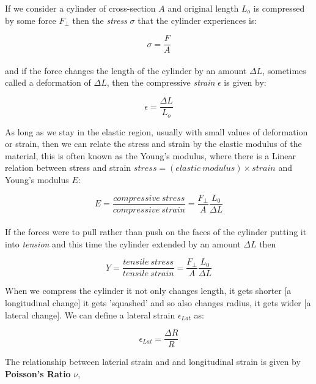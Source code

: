 \documentclass[12pt, letterpaper, twoside]{article}
\begin{document}
\bigskip

If we consider a cylinder of cross-section $A$ and original length $L_o$ is compressed by some force $F_\bot$ then the \emph{stress} $\sigma$ that the cylinder experiences is:

\begin{equation}
\sigma = \frac{F}{A}
\end{equation}
\\
and if the force changes the length of the cylinder by an amount $\Delta L$, sometimes called a deformation of $\Delta L$, then the compressive \emph{strain} $\epsilon$ is given by:

\begin{equation}
\epsilon = \frac{\Delta L}{L_o}
\end{equation}


\bigskip

As long as we stay in the elastic region, usually with small values of deformation or strain, then we can relate the stress and strain by the elastic modulus of the material, this is often known as the Young's modulus, where there is a Linear relation between stress and strain $ stress = (elastic \ modulus) \times strain $ and Young's modulus $E$:

\begin{equation}
E = \frac{compressive \ stress}{compressive \ strain} = \frac{F_\bot}{A} \frac{L_0}{\Delta L}
\end{equation}
\\
If the forces were to pull rather than push on the faces of the cylinder putting it into \emph{tension} and this time the cylinder extended by an amount $\Delta L$ then 

\begin{equation}
Y = \frac{tensile \ stress}{tensile \ strain} = \frac{F_\bot}{A} \frac{L_0}{\Delta L}
\end{equation}

\bigskip

When we compress the cylinder it not only changes length, it gets shorter [a longitudinal change] it gets 'squashed' and so also changes radius, it gets wider [a lateral change].  We can define a lateral strain $\epsilon_{Lat}$ as:

\begin{equation}
\epsilon_{Lat} = \frac {\Delta R}{R}
\end{equation}



The relationship between laterial strain and and longitudinal strain is given by   \textbf{Poisson's Ratio} $\nu$,
\end{document}
